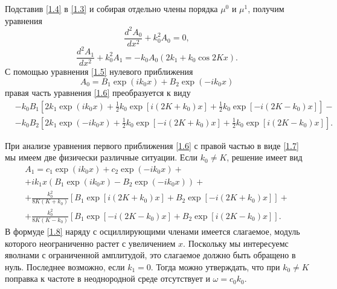 Подставив \eqref{1.4} в \eqref{1.3} и собирая отдельно члены порядка $\mu^0$ и $\mu^1$, получим уравнения
\begin{equation}\label{1.5}
\frac{d^2 A_0}{dx^2}+k_0^2A_0=0,
\end{equation}
\begin{equation}\label{1.6}
\frac{d^2 A_1}{dx^2}+k_0^2A_1=-k_0A_0(2k_1+k_0\cos 2Kx).
\end{equation}
С помощью уравнения \eqref{1.5} нулевого приближения
$$
A_0=B_1\exp(ik_0x) + B_2 \exp(-ik_0x)
$$
правая часть уравнения \eqref{1.6} преобразуется к виду
\begin{equation}\label{1.7}
\begin{split}
&-k_0B_1\left[2k_1\exp(ik_0x)+\frac{1}{2}k_0\exp[i(2K+k_0)x]+\frac{1}{2}k_0\exp[-i(2K-k_0)x]\right]-{}\\
&-k_0B_2\left[2k_1\exp(-ik_0x)+\frac{1}{2}k_0\exp[-i(2K+k_0)x]+\frac{1}{2}k_0\exp[i(2K-k_0)x]\right].
\end{split}
\end{equation}

При анализе уравнения первого приближения \eqref{1.6} с правой частью в виде \eqref{1.7} мы имеем две физически различные ситуации. Если $k_0 \neq K$, решение имеет вид
\begin{multline}\label{1.8}
A_1=c_1\exp(ik_0x)+c_2\exp(-ik_0x)+\\
+ik_1x(B_1\exp(ik_0x)-B_2\exp(-ik_0x))+\\
+\frac{k_0^2}{8K(K+k_0)}\left[B_1\exp[i(2K+k_0)x]+B_2\exp[-i(2K+k_0)x]\right]+\\
+\frac{k_0^2}{8K(K-k_0)}\left[B_1\exp[-i(2K-k_0)x]+B_2\exp[i(2K-k_0)x]\right].
\end{multline}
В формуде \eqref{1.8} наряду с осциллирующими членами имеется слагаемое, модуль которого неограниченно растет с увеличением $x$. Поскольку мы интересуемс яволнами с ограниченной амплитудой, это слагаемое должно быть обращено в нуль. Последнее возможно, если $k_1=0$. Тогда можно утверждать, что при $k_0\neq K$ поправка к частоте в неоднородной среде отсутствует и $\omega=c_0k_0$.


